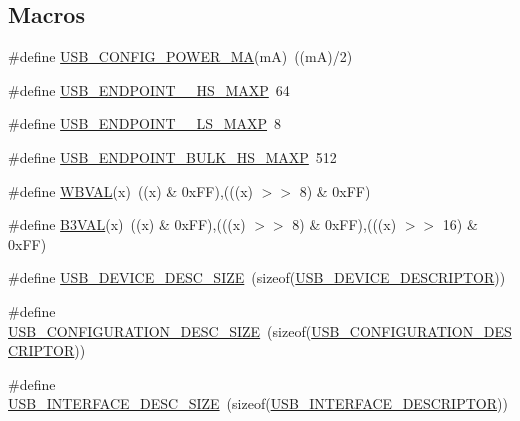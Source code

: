 \subsection*{Macros}
\begin{DoxyCompactItemize}
\item 
\#define \hyperlink{group___u_s_b_d___core_gadcf08dc7fdb6117608624203612b3104}{U\+S\+B\+\_\+\+C\+O\+N\+F\+I\+G\+\_\+\+P\+O\+W\+E\+R\+\_\+\+MA}(mA)~((mA)/2)
\item 
\#define \hyperlink{group___u_s_b_d___core_gac8df859211824ddcf32db5c80b06290a}{U\+S\+B\+\_\+\+E\+N\+D\+P\+O\+I\+N\+T\+\_\+\_\+\+H\+S\+\_\+\+M\+A\+XP}~64
\item 
\#define \hyperlink{group___u_s_b_d___core_ga2b0c6c2be1d518967da6c7b32458c894}{U\+S\+B\+\_\+\+E\+N\+D\+P\+O\+I\+N\+T\+\_\+\_\+\+L\+S\+\_\+\+M\+A\+XP}~8
\item 
\#define \hyperlink{group___u_s_b_d___core_gad4839d37e7a31a4d9e8ddf242b16608f}{U\+S\+B\+\_\+\+E\+N\+D\+P\+O\+I\+N\+T\+\_\+\+B\+U\+L\+K\+\_\+\+H\+S\+\_\+\+M\+A\+XP}~512
\item 
\#define \hyperlink{group___u_s_b_d___core_ga018fc058eba40cffd92be1756a5d2b40}{W\+B\+V\+AL}(x)~((x) \& 0x\+F\+F),(((x) $>$$>$ 8) \& 0x\+F\+F)
\item 
\#define \hyperlink{group___u_s_b_d___core_ga217165f37f8e1835ea51da6e19768402}{B3\+V\+AL}(x)~((x) \& 0x\+F\+F),(((x) $>$$>$ 8) \& 0x\+F\+F),(((x) $>$$>$ 16) \& 0x\+F\+F)
\item 
\#define \hyperlink{group___u_s_b_d___core_gacd04660262562260957b6df8d5e482b3}{U\+S\+B\+\_\+\+D\+E\+V\+I\+C\+E\+\_\+\+D\+E\+S\+C\+\_\+\+S\+I\+ZE}~(sizeof(\hyperlink{group___u_s_b_d___core_ga7c2da119cc5c129d253d5fa766c70893}{U\+S\+B\+\_\+\+D\+E\+V\+I\+C\+E\+\_\+\+D\+E\+S\+C\+R\+I\+P\+T\+OR}))
\item 
\#define \hyperlink{group___u_s_b_d___core_ga136546c0b0fefbc4d0684f1a70a86d3e}{U\+S\+B\+\_\+\+C\+O\+N\+F\+I\+G\+U\+R\+A\+T\+I\+O\+N\+\_\+\+D\+E\+S\+C\+\_\+\+S\+I\+ZE}~(sizeof(\hyperlink{group___u_s_b_d___core_ga196f799666c475a9064909c6e72b9d72}{U\+S\+B\+\_\+\+C\+O\+N\+F\+I\+G\+U\+R\+A\+T\+I\+O\+N\+\_\+\+D\+E\+S\+C\+R\+I\+P\+T\+OR}))
\item 
\#define \hyperlink{group___u_s_b_d___core_gac7fd274cdd131f4c0addec7a139bc9b7}{U\+S\+B\+\_\+\+I\+N\+T\+E\+R\+F\+A\+C\+E\+\_\+\+D\+E\+S\+C\+\_\+\+S\+I\+ZE}~(sizeof(\hyperlink{group___u_s_b_d___core_gac933513ce6cbf852d0dc998bd8fb333d}{U\+S\+B\+\_\+\+I\+N\+T\+E\+R\+F\+A\+C\+E\+\_\+\+D\+E\+S\+C\+R\+I\+P\+T\+OR}))
\item 
$$
\end{DoxyCompactItemize}
